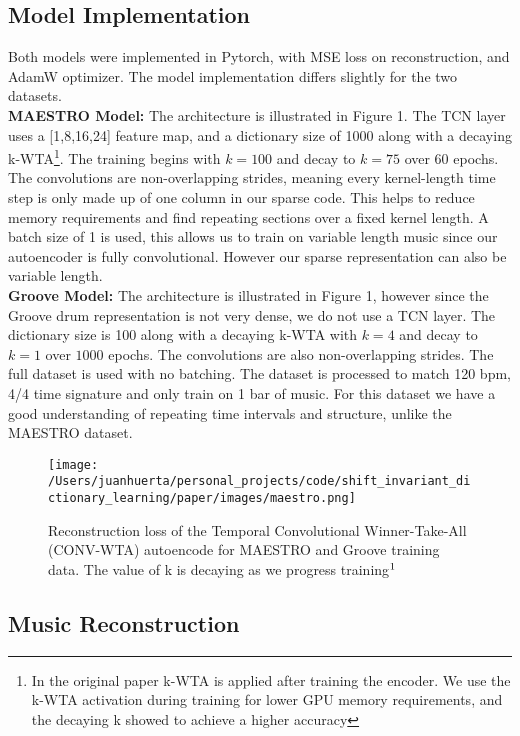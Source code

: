 \documentclass[11pt,a4paper]{article}
\begin{document}
\subsection{Model Implementation}
Both models were implemented in Pytorch, with MSE loss on reconstruction, and AdamW optimizer. The model implementation differs slightly for the two datasets. 
 \\
\textbf{MAESTRO Model: } The architecture is illustrated in Figure 1. The TCN layer uses a [1,8,16,24] feature map, and a dictionary size of 1000 along with a decaying k-WTA\footnote{In the original paper k-WTA is applied after training the encoder. We use the k-WTA activation during training for lower GPU memory requirements, and the decaying k showed to achieve a higher accuracy}. The training begins with $k=100$ and decay to $k=75$ over $60$ epochs. The convolutions are non-overlapping strides, meaning every kernel-length time step is only made up of one column in our sparse code. This helps to reduce memory requirements and find repeating sections over a fixed kernel length. A batch size of 1 is used, this allows us to train on variable length music since our autoencoder is fully convolutional.  However our sparse representation can also be variable length. \\ 
\textbf{Groove Model: } The architecture is illustrated in Figure 1, however since the Groove drum representation is not very dense, we do not use a TCN layer. The  dictionary size is 100 along with a decaying k-WTA with $k=4$ and decay to $k=1$ over $1000$ epochs. The convolutions are  also non-overlapping strides. The full dataset is used with no batching. The dataset is processed to match 120 bpm, 4/4 time signature and only train on 1 bar of music. For this dataset we have a good understanding of repeating time intervals and structure, unlike the MAESTRO dataset.


\begin{figure*}[ht]
  \texttt{[image: /Users/juanhuerta/personal\_projects/code/shift\_invariant\_dictionary\_learning/paper/images/maestro.png]}
  \caption{ Reconstruction loss of the Temporal Convolutional Winner-Take-All (CONV-WTA) autoencode for MAESTRO and Groove training data. The value of k is decaying as we progress training$\textsuperscript{1}$ }
  \label{fig:boat2}
\end{figure*}


\subsection{Music Reconstruction}
\label{ssec:first}
\end{document}
